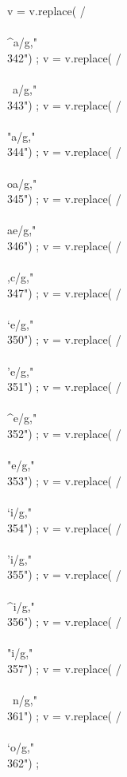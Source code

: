 {      v = v.replace(  /\\\\^a/g,"\\342") ;
      v = v.replace(  /\\\\~a/g,"\\343") ;
      v = v.replace(  /\\\\"a/g,"\\344") ;
      v = v.replace(  /\\\\oa/g,"\\345") ;
      v = v.replace(  /\\\\ae/g,"\\346") ;
      v = v.replace(  /\\\\,c/g,"\\347") ;
      v = v.replace(  /\\\\`e/g,"\\350") ;
      v = v.replace(  /\\\\'e/g,"\\351") ;
      v = v.replace(  /\\\\^e/g,"\\352") ;
      v = v.replace(  /\\\\"e/g,"\\353") ;
      v = v.replace(  /\\\\`i/g,"\\354") ;
      v = v.replace(  /\\\\'i/g,"\\355") ;
      v = v.replace(  /\\\\^i/g,"\\356") ;
      v = v.replace(  /\\\\"i/g,"\\357") ;
      v = v.replace(  /\\\\~n/g,"\\361") ;
      v = v.replace(  /\\\\`o/g,"\\362") ;
}
